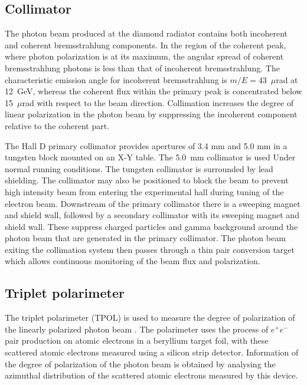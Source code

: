 \subsection{Collimator}
The photon beam produced at the diamond radiator contains both incoherent
and coherent bremsstrahlung components. In the region of the coherent peak,
where photon polarization is at its maximum, the angular spread of coherent
bremsstrahlung photons is less than that of incoherent bremsstrahlung.
The characteristic emission angle for incoherent bremsstrahlung is
$m/E = 43$~$\mu$rad at 12~GeV, whereas the coherent flux within the
primary peak is concentrated below 15~$\mu$rad with respect to the beam
direction. Collimation increases the degree of linear polarization in
the photon beam by suppressing the incoherent component relative to the
coherent part.

The Hall D primary collimator provides apertures of 3.4 mm and 5.0 mm in a
tungsten block mounted on an X-Y table. The 5.0~mm collimator is used
Under normal \GX{} running conditions.
The tungsten collimator is surrounded by lead shielding.
The collimator may also be positioned to block the beam to prevent
high intensity beam from entering the experimental hall during tuning
of the electron beam. Downstream of the primary collimator there is a
sweeping magnet and shield wall, followed by a secondary collimator
with its sweeping magnet and shield wall. These suppress charged
particles and gamma background around the photon beam that are
generated in the primary collimator. The photon beam exiting the
collimation system then passes through a thin pair conversion target
which allows continuous monitoring of the beam flux and polarization.

\subsection{Triplet polarimeter \label{sec:tpol}}
The triplet polarimeter (TPOL) is used to measure the degree of polarization
of the linearly polarized photon beam \cite{DUGGER2017115}.
The polarimeter uses the process of $e^+e^-$ pair production on atomic electrons 
in a beryllium target foil, with these scattered atomic electrons
measured using a silicon strip detector.
Information of the degree of polarization of the photon beam is
obtained by analysing the azimuthal distribution of the scattered
atomic electrons measured by this device.

